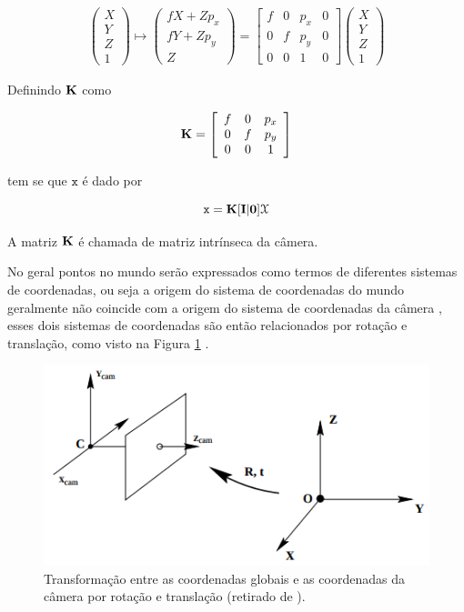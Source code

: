 {\begin{align}
\left(\begin{array}{c}
X\\
Y\\
Z\\
1
\end{array}\right) \mapsto
\left(\begin{array}{c}
fX + Zp_x\\
fY + Zp_y\\
Z
\end{array}\right) =
\left[\begin{array}{cccc}
f & 0 & p_x & 0\\
0 & f & p_y & 0\\
0 & 0 & 1 & 0
\end{array}\right]
\left(\begin{array}{c}
X\\
Y\\
Z\\
1
\end{array}\right)
\label{eq:3d_vetHomogeneo2}
\end{align}

Definindo $\bf{K}$ como

\begin{align}
\bf{K} =
\left[\begin{array}{ccc}
f & 0 & p_x\\
0 & f & p_y\\
0 & 0 & 1
\end{array}\right]
\label{eq:3d_matIntrinseca}
\end{align}

tem se que $\mathtt{x}$ é dado por

\begin{equation}
\mathtt{x} = \bf{K}[\bf{I}|0]\mathcal{X}
\label{3d_camModel1}
\end{equation}

A matriz $\bf{K}$ é chamada de matriz intrínseca da câmera.

No geral pontos no mundo serão expressados como termos de diferentes sistemas de coordenadas, ou seja a origem do sistema de coordenadas do mundo geralmente não coincide com a origem do sistema de coordenadas da câmera \cite{hartley2003multiple}, esses dois sistemas de coordenadas são então relacionados por rotação e translação, como visto na Figura \ref{fig:trans_rot} .

\begin{figure}[h!]
\centering
\includegraphics[width=.5\linewidth]{figs/TG_rot_tr.png}
\caption{Transformação entre as coordenadas globais e as coordenadas da câmera por rotação e translação (retirado de \cite{hartley2003multiple}).}
\label{fig:trans_rot}
\end{figure}

}
